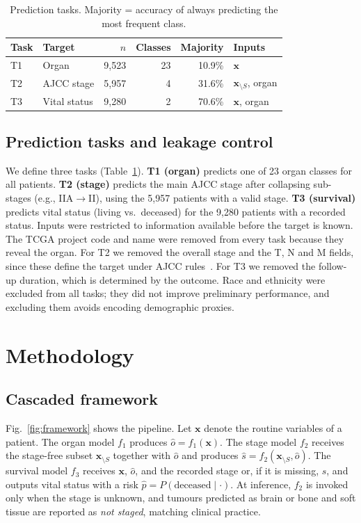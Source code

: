 \documentclass[conference]{IEEEtran}
\begin{document}
\begin{table}[t]
\caption{Prediction tasks. Majority = accuracy of always predicting the most frequent class.}
\label{tab:tasks}
\centering
\footnotesize
\setlength{\tabcolsep}{3.5pt}
\begin{tabular}{llrrrl}
\toprule
Task & Target & $n$ & Classes & Majority & Inputs \\
\midrule
T1 & Organ & 9,523 & 23 & 10.9\% & $\mathbf{x}$ \\
T2 & AJCC stage & 5,957 & 4 & 31.6\% & $\mathbf{x}_{\setminus S}$, organ \\
T3 & Vital status & 9,280 & 2 & 70.6\% & $\mathbf{x}$, organ \\
\bottomrule
\end{tabular}
\end{table}

\subsection{Prediction tasks and leakage control}
We define three tasks (Table~\ref{tab:tasks}). \textbf{T1 (organ)} predicts one of 23 organ classes for all patients. \textbf{T2 (stage)} predicts the main AJCC stage after collapsing sub-stages (e.g., IIA$\rightarrow$II), using the 5,957 patients with a valid stage. \textbf{T3 (survival)} predicts vital status (living vs.\ deceased) for the 9,280 patients with a recorded status. Inputs were restricted to information available before the target is known. The TCGA project code and name were removed from every task because they reveal the organ. For T2 we removed the overall stage and the T, N and M fields, since these define the target under AJCC rules~\cite{amin2017}. For T3 we removed the follow-up duration, which is determined by the outcome. Race and ethnicity were excluded from all tasks; they did not improve preliminary performance, and excluding them avoids encoding demographic proxies.

\section{Methodology}
\subsection{Cascaded framework}
Fig.~\ref{fig:framework} shows the pipeline. Let $\mathbf{x}$ denote the routine variables of a patient. The organ model $f_1$ produces $\hat{o}=f_1(\mathbf{x})$. The stage model $f_2$ receives the stage-free subset $\mathbf{x}_{\setminus S}$ together with $\hat{o}$ and produces $\hat{s}=f_2(\mathbf{x}_{\setminus S},\hat{o})$. The survival model $f_3$ receives $\mathbf{x}$, $\hat{o}$, and the recorded stage or, if it is missing, $\hat{s}$, and outputs vital status with a risk $\hat{p}=P(\text{deceased}\mid\cdot)$. At inference, $f_2$ is invoked only when the stage is unknown, and tumours predicted as brain or bone and soft tissue are reported as \emph{not staged}, matching clinical practice.
\end{document}
